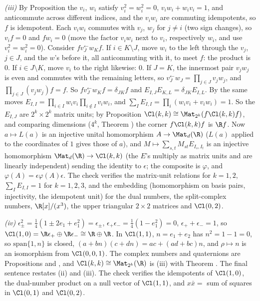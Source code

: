\emph{(iii)} By Proposition  the $v_{i}$, $w_{i}$ satisfy $v_{i}^{2} = w_{i}^{2} = 0$, $v_{i}w_{i} + w_{i}v_{i} = 1$, and anticommute across different indices, and the $v_{i}w_{i}$ are commuting idempotents, so $f$ is idempotent. Each $v_{i}w_{i}$ commutes with $v_{j}$, $w_{j}$ for $j \ne i$ (two sign changes), so $v_{i}f = 0$ and $fw_{i} = 0$ (move the factor $v_{i}w_{i}$ next to $v_{i}$, respectively $w_{i}$, and use $v_{i}^{2} = w_{i}^{2} = 0$). Consider $fv_{J}^{\leftarrow}w_{K}f$. If $i \in K \setminus J$, move $w_{i}$ to the left through the $v_{j}$, $j \in J$, and the $w$'s before it, all anticommuting with it, to meet $f$: the product is $0$. If $i \in J \setminus K$, move $v_{i}$ to the right likewise: $0$. If $J = K$, the innermost pair $v_{j}w_{j}$ is even and commutes with the remaining letters, so $v_{J}^{\leftarrow}w_{J} = \prod_{j \in J}v_{j}w_{j}$, and $\prod_{j \in J}(v_{j}w_{j})f = f$. So $fv_{J}^{\leftarrow}w_{K}f = \delta_{JK}f$ and $E_{I,J}E_{K,L} = \delta_{JK}E_{I,L}$. By the same moves $E_{I,I} = \prod_{i \in I}w_{i}v_{i}\prod_{i \notin I}v_{i}w_{i}$, and $\sum_{I}E_{I,I} = \prod_{i}(w_{i}v_{i} + v_{i}w_{i}) = 1$. So the $E_{I,J}$ are $2^{k} \times 2^{k}$ matrix units; by Proposition  $\Cl(k,k) \cong \Mat_{2^{k}}(f\Cl(k,k)f)$, and comparing dimensions ($4^{k}$, Theorem ) the corner $f\Cl(k,k)f$ is $\R f$. Now $a \mapsto L(a)$ is an injective unital homomorphism $A \to \Mat_{d}(\R)$ ($L(a)$ applied to the coordinates of $1$ gives those of $a$), and $M \mapsto \sum_{s,t}M_{st}E_{I_{s},I_{t}}$ is an injective homomorphism $\Mat_{d}(\R) \to \Cl(k,k)$ (the $E$'s multiply as matrix units and are linearly independent) sending the identity to $\epsilon$; the composite is $\varphi$, and $\varphi(A) = \epsilon\varphi(A)\epsilon$. The check verifies the matrix-unit relations for $k = 1, 2$, $\sum_{I}E_{I,I} = 1$ for $k = 1, 2, 3$, and the embedding (homomorphism on basis pairs, injectivity, the idempotent unit) for the dual numbers, the split-complex numbers, $\R[x]/(x^{3})$, the upper triangular $2 \times 2$ matrices and $\Cl(0,2)$.

\emph{(iv)} $\epsilon_{\pm}^{2} = \tfrac14(1 \pm 2e_{1} + e_{1}^{2}) = \epsilon_{\pm}$, $\epsilon_{+}\epsilon_{-} = \tfrac14(1 - e_{1}^{2}) = 0$, $\epsilon_{+} + \epsilon_{-} = 1$, so $\Cl(1,0) = \R\epsilon_{+} \oplus \R\epsilon_{-} \cong \R \oplus \R$. In $\Cl(1,1)$, $n = e_{1} + e_{2}$ has $n^{2} = 1 - 1 = 0$, so $\mathrm{span}\{1, n\}$ is closed, $(a + bn)(c + dn) = ac + (ad + bc)n$, and $\rho \mapsto n$ is an isomorphism from $\Cl(0,0,1)$. The complex numbers and quaternions are Propositions  and , and $\Cl(k,k) \cong \Mat_{2^{k}}(\R)$ is (iii) with Theorem . The final sentence restates (ii) and (iii). The check verifies the idempotents of $\Cl(1,0)$, the dual-number product on a null vector of $\Cl(1,1)$, and $x\bar{x} = $ sum of squares in $\Cl(0,1)$ and $\Cl(0,2)$.
